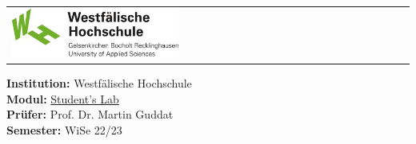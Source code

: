 \begin{titlepage}
    \maketitle
    \vspace{3cm}
    \begin{tabular}{l c r}
        \includegraphics[width={0.45\textwidth}]{../assets/img/whs}
        & \hspace*{\fill} &
        
    \end{tabular}
    \vspace*{\fill}
    \begin{flushleft}
        \Large{\textbf{Institution:} Westfälische Hochschule}\\
        \Large{\textbf{Modul:} \href{https://moodle.w-hs.de/course/view.php?id=36}{Student's Lab}} \\
        \Large{\textbf{Prüfer:} Prof. Dr. Martin Guddat}\\
        \Large{\textbf{Semester:} WiSe 22/23}
    \end{flushleft}
\end{titlepage}
